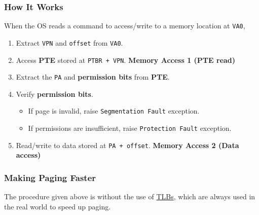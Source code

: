 \documentclass[10pt]{report}
\begin{document}
\subsubsection{How It Works}
When the OS reads a command to access/write to a memory location at \texttt{VA0},
\begin{enumerate}
    \item Extract \texttt{VPN} and \texttt{offset} from \texttt{VA0}.
    \item Access \textbf{PTE} stored at \texttt{PTBR + VPN}. \hfill \textbf{Memory Access 1 (PTE read)}
    \item Extract the \texttt{PA} and \textbf{permission bits} from \textbf{PTE}.
    \item Verify \textbf{permission bits}.
    \begin{itemize}
        \item If page is invalid, raise \texttt{Segmentation Fault} exception.
        \item If permissions are insufficient, raise \texttt{Protection Fault} exception. 
    \end{itemize}
    \item Read/write to data stored at \texttt{PA + offset}. \hfill \textbf{Memory Access 2 (Data access)}
\end{enumerate}
\subsubsection{Making Paging Faster}
The procedure given above is without the use of \hyperref[subsec:TLB]{TLBs}, which are always used in the real world to speed up paging. 
\end{document}
